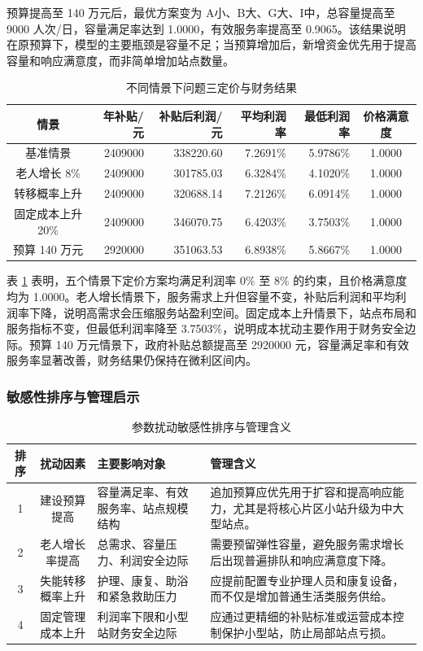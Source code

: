 预算提高至 140 万元后，最优方案变为 A小、B大、G大、I中，总容量提高至 9000 人次/日，容量满足率达到 1.0000，有效服务率提高至 0.9065。该结果说明在原预算下，模型的主要瓶颈是容量不足；当预算增加后，新增资金优先用于提高容量和响应满意度，而非简单增加站点数量。

\begin{table}[H]
\centering
\caption{不同情景下问题三定价与财务结果}
\label{tab:p4_finance}
\begin{tabular}{c r r r r c}
\toprule
情景 & 年补贴/元 & 补贴后利润/元 & 平均利润率 & 最低利润率 & 价格满意度 \\
\midrule
基准情景 & 2409000 & 338220.60 & 7.2691\% & 5.9786\% & 1.0000 \\
老人增长 8\% & 2409000 & 301785.03 & 6.3284\% & 4.1020\% & 1.0000 \\
转移概率上升 & 2409000 & 320688.14 & 7.2126\% & 6.0914\% & 1.0000 \\
固定成本上升 20\% & 2409000 & 346070.75 & 6.4203\% & 3.7503\% & 1.0000 \\
预算 140 万元 & 2920000 & 351063.53 & 6.8938\% & 5.8667\% & 1.0000 \\
\bottomrule
\end{tabular}
\end{table}

表 \ref{tab:p4_finance} 表明，五个情景下定价方案均满足利润率 $0\%$ 至 $8\%$ 的约束，且价格满意度均为 1.0000。老人增长情景下，服务需求上升但容量不变，补贴后利润和平均利润率下降，说明高需求会压缩服务站盈利空间。固定成本上升情景下，站点布局和服务指标不变，但最低利润率降至 3.7503\%，说明成本扰动主要作用于财务安全边际。预算 140 万元情景下，政府补贴总额提高至 2920000 元，容量满足率和有效服务率显著改善，财务结果仍保持在微利区间内。

\subsubsection{敏感性排序与管理启示}

\begin{table}[H]
\centering
\caption{参数扰动敏感性排序与管理含义}
\label{tab:p4_sensitivity_rank}
\begin{tabular}{c c p{} p{}}
\toprule
排序 & 扰动因素 & 主要影响对象 & 管理含义 \\
\midrule
1 & 建设预算提高 & 容量满足率、有效服务率、站点规模结构 & 追加预算应优先用于扩容和提高响应能力，尤其是将核心片区小站升级为中大型站点。 \\
2 & 老人增长率提高 & 总需求、容量压力、利润安全边际 & 需要预留弹性容量，避免服务需求增长后出现普遍排队和响应满意度下降。 \\
3 & 失能转移概率上升 & 护理、康复、助浴和紧急救助压力 & 应提前配置专业护理人员和康复设备，而不仅是增加普通生活类服务供给。 \\
4 & 固定管理成本上升 & 利润率下限和小型站财务安全边际 & 应通过更精细的补贴标准或运营成本控制保护小型站，防止局部站点亏损。 \\
\bottomrule
\end{tabular}
\end{table}

